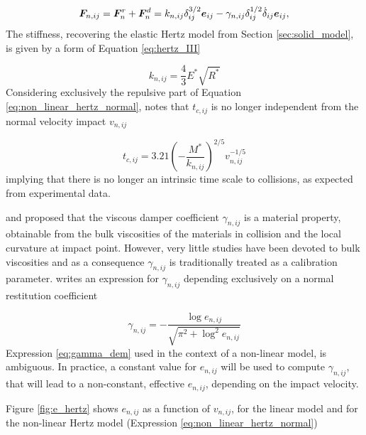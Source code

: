 \begin{equation} \label{eq:non_linear_hertz_normal}
	\boldsymbol{F}_{n,ij}=\boldsymbol{F}_n^r+\boldsymbol{F}_n^d=k_{n,ij}\delta_{ij}^{3/2}\boldsymbol{e}_{ij}-\gamma_{n,ij}\delta_{ij}^{1/2}\dot{\delta}_{ij}\boldsymbol{e}_{ij},
\end{equation}
%
The stiffness, recovering the elastic Hertz model from Section \ref{sec:solid_model}, is given by a form of Equation \eqref{eq:hertz_III} 

%
\begin{equation} \label{eq:rigidity_hertz}
	k_{n,ij}=\frac{4}{3}E^*\sqrt{R^*}
\end{equation}
%
Considering exclusively the repulsive part of Equation \eqref{eq:non_linear_hertz_normal}, \cite{Shaefer-1996} notes that $t_{c,ij}$ is no longer independent from the normal velocity impact $v_{n,ij}$

%
\begin{equation} \label{eq:non_linear_tc}
	t_{c,ij}=3.21 \left( -\frac{M^*}{k_{n,ij}} \right)^{2/5}v_{n,ij}^{-1/5}
\end{equation}
%
implying that there is no longer an intrinsic time scale to collisions, as expected from experimental data.

\cite{Brilliantov-1996} and \cite{Brilliantov-2001} proposed that the viscous damper coefficient $\gamma_{n,ij}$ is a material property, obtainable from the bulk viscosities of the materials in collision and the local curvature at impact point. However, very little studies have been devoted to bulk viscosities and as a consequence $\gamma_{n,ij}$ is traditionally treated as a calibration parameter. \cite{Cummins-2011} writes an expression for $\gamma_{n,ij}$ depending exclusively on a normal restitution coefficient

%
\begin{equation} \label{eq:gamma_dem}
	\gamma_{n,ij}=-\frac{\log{e_{n,ij}}}{\sqrt{\pi^2+\log^2{e_{n,ij}}}}
\end{equation}
%
Expression \eqref{eq:gamma_dem} used in the context of a non-linear model, is ambiguous. In practice, a constant value for $e_{n,ij}$ will be used to compute $\gamma_{n,ij}$, that will lead to a non-constant, effective $e_{n,ij}$, depending on the impact velocity.

Figure \ref{fig:e_hertz} shows $e_{n,ij}$ as a function of $v_{n,ij}$, for the linear model and for the non-linear Hertz model (Expression \eqref{eq:non_linear_hertz_normal})

